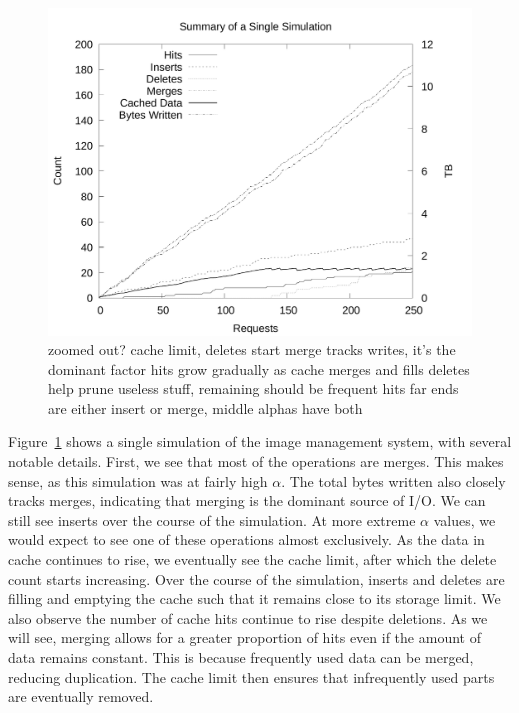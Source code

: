 \documentclass[sigconf]{acmart}
\begin{document}
\begin{figure}
\includegraphics[width=\linewidth]{curated/time-series/time-series.pdf}
\label{fig:series}
zoomed out?
cache limit, deletes start
merge tracks writes, it's the dominant factor
hits grow gradually as cache merges and fills
deletes help prune useless stuff, remaining should be frequent hits
far ends are either insert or merge, middle alphas have both
\fi
\end{figure}

Figure~\ref{fig:series} shows a single simulation of the image management system,
with several notable details.
First, we see that most of the operations are merges.
This makes sense, as this simulation was at fairly high $\alpha$.
The total bytes written also closely tracks merges,
indicating that merging is the dominant source of I/O.
We can still see inserts over the course of the simulation.
At more extreme $\alpha$ values,
we would expect to see one of these operations almost exclusively.
As the data in cache continues to rise,
we eventually see the cache limit,
after which the delete count starts increasing.
Over the course of the simulation,
inserts and deletes are filling and emptying the cache such that it remains close to its storage limit.
We also observe the number of cache hits continue to rise despite deletions.
As we will see, merging allows for a greater proportion of hits even if the amount of data remains constant.
This is because frequently used data can be merged,
reducing duplication.
The cache limit then ensures that infrequently used parts are eventually removed.
\end{document}
